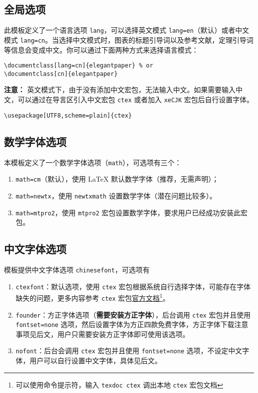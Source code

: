 \documentclass[lang=cn,a4paper,newtx]{elegantpaper}
\begin{document}
\subsection{全局选项}
此模板定义了一个语言选项 \lstinline{lang}，可以选择英文模式 \lstinline{lang=en}（默认）或者中文模式 \lstinline{lang=cn}。当选择中文模式时，图表的标题引导词以及参考文献，定理引导词等信息会变成中文。你可以通过下面两种方式来选择语言模式：
\begin{lstlisting}
\documentclass[lang=cn]{elegantpaper} % or
\documentclass[cn]{elegantpaper} 
\end{lstlisting}

\textbf{注意：} 英文模式下，由于没有添加中文宏包，无法输入中文。如果需要输入中文，可以通过在导言区引入中文宏包 \lstinline{ctex} 或者加入 \lstinline{xeCJK} 宏包后自行设置字体。 
\begin{lstlisting}
\usepackage[UTF8,scheme=plain]{ctex}
\end{lstlisting}

\subsection{数学字体选项}

本模板定义了一个数学字体选项（\lstinline{math}），可选项有三个：
\begin{enumerate}
  \item \lstinline{math=cm}（默认），使用 \LaTeX{} 默认数学字体（推荐，无需声明）；
  \item \lstinline{math=newtx}，使用 \lstinline{newtxmath} 设置数学字体（潜在问题比较多）。
  \item \lstinline{math=mtpro2}，使用 \lstinline{mtpro2} 宏包设置数学字体，要求用户已经成功安装此宏包。
\end{enumerate}

\subsection{中文字体选项}

模板提供中文字体选项 \lstinline{chinesefont}，可选项有
\begin{enumerate}
  \item \lstinline{ctexfont}：默认选项，使用 \lstinline{ctex} 宏包根据系统自行选择字体，可能存在字体缺失的问题，更多内容参考 \lstinline{ctex} 宏包\href{https://ctan.org/pkg/ctex}{官方文档}\footnote{可以使用命令提示符，输入 \lstinline{texdoc ctex} 调出本地 \lstinline{ctex} 宏包文档}。
  \item \lstinline{founder}：方正字体选项（\textbf{需要安装方正字体}），后台调用 \lstinline{ctex} 宏包并且使用 \lstinline{fontset=none} 选项，然后设置字体为方正四款免费字体，方正字体下载注意事项见后文，用户只需要安装方正字体即可使用该选项。
  \item \lstinline{nofont}：后台会调用 \lstinline{ctex} 宏包并且使用 \lstinline{fontset=none} 选项，不设定中文字体，用户可以自行设置中文字体，具体见后文。
\end{enumerate}
\end{document}
